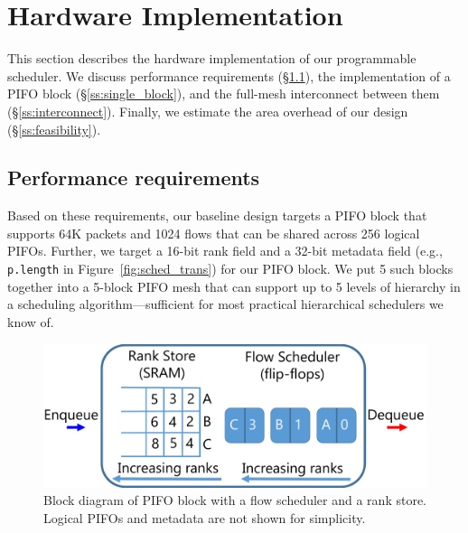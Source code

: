 \section{Hardware Implementation}
\label{s:hardware}
This section describes the hardware implementation of our programmable
scheduler. We discuss performance requirements
(\S\ref{ss:performance}), the implementation of a PIFO block
(\S\ref{ss:single_block}), and the full-mesh interconnect between them
(\S\ref{ss:interconnect}).  Finally, we estimate the area overhead of
our design (\S\ref{ss:feasibility}).

\subsection{Performance requirements}
\label{ss:performance}


 Based on these requirements, our baseline design targets a PIFO block that
supports 64K packets and 1024 flows that can be shared across 256 logical
PIFOs. Further, we target a 16-bit rank field and a 32-bit metadata field
(e.g., {\tt p.length} in Figure~\ref{fig:sched_trans}) for our PIFO block.
We put 5 such blocks together into a 5-block PIFO mesh that can
support up to 5 levels of hierarchy in a scheduling algorithm---sufficient for
most practical hierarchical schedulers we know of.

\begin{figure}[!t]
  \centering
  \includegraphics[width=0.6\columnwidth]{pifo_pifo_impl.pdf}
  \caption{Block diagram of PIFO block with a flow scheduler and a
   rank store. Logical PIFOs and metadata are not shown for simplicity.}
  \label{fig:pifo_impl}
\end{figure}

